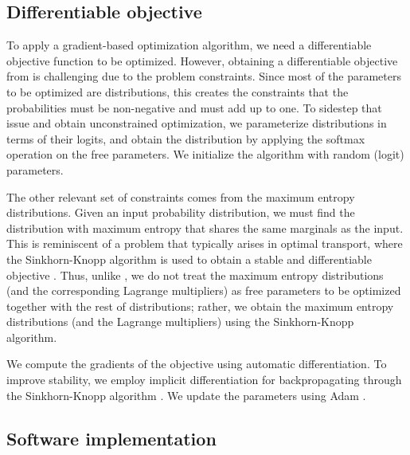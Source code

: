 \documentclass[11pt, a4paper, copyright, gdm]{google}
\theoremstyle{definition}
\theoremstyle{remark}
\theoremstyle{plain}
\begin{document}
\subsection{Differentiable objective}

To apply a gradient-based optimization algorithm, we need a differentiable objective function to be optimized. However, obtaining a differentiable objective from  is challenging due to the problem constraints.
Since most of the parameters to be optimized are distributions, this creates the constraints that the probabilities must be non-negative and must add up to one. To sidestep that issue and obtain unconstrained optimization, we parameterize distributions in terms of their logits, and obtain the distribution by applying the softmax operation on the free parameters. We initialize the algorithm with random (logit) parameters.

The other relevant set of constraints comes from the maximum entropy distributions. Given an input probability distribution, we must find the distribution with maximum entropy that shares the same marginals as the input. This is reminiscent of a problem that typically arises in optimal transport, where the Sinkhorn-Knopp algorithm \citep{sinkhorn1967concerning} is used to obtain a stable and differentiable objective \citep{cuturi2013sinkhorn}. Thus, unlike \cite{alman2025more}, we do not treat the maximum entropy distributions (and the corresponding Lagrange multipliers) as free parameters to be optimized together with the rest of distributions; rather, we obtain the maximum entropy distributions (and the Lagrange multipliers) using the Sinkhorn-Knopp algorithm.

We compute the gradients of the objective using automatic differentiation. To improve stability, we employ implicit differentiation for backpropagating through the Sinkhorn-Knopp algorithm \citep{cuturi2020supervised,eisenberger2022unified}. We update the parameters using Adam \citep{kingma2015adam}.

\subsection{Software implementation}
\end{document}

